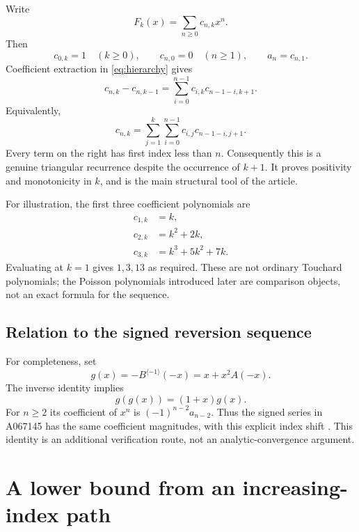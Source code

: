 \documentclass[11pt]{article}
\numberwithin{equation}{section}
\theoremstyle{remark}
\begin{document}
Write
\[
 F_k(x)=\sum_{n\ge0}c_{n,k}x^n.
\]
Then
\begin{equation}\label{eq:boundary}
 c_{0,k}=1\quad(k\ge0),\qquad c_{n,0}=0\quad(n\ge1),
 \qquad a_n=c_{n,1}.
\end{equation}
Coefficient extraction in \eqref{eq:hierarchy} gives
\begin{equation}\label{eq:triangular}
 c_{n,k}-c_{n,k-1}
 =\sum_{i=0}^{n-1}c_{i,k}c_{n-1-i,k+1}.
\end{equation}
Equivalently,
\begin{equation}\label{eq:triangularsum}
 c_{n,k}=\sum_{j=1}^k\sum_{i=0}^{n-1}
                  c_{i,j}c_{n-1-i,j+1}.
\end{equation}
Every term on the right has first index less than $n$. Consequently this
is a genuine triangular recurrence despite the occurrence of $k+1$.
It proves positivity and monotonicity in $k$, and is the main structural
tool of the article.

For illustration, the first three coefficient polynomials are
\begin{align*}
 c_{1,k}&=k,\\
 c_{2,k}&=k^2+2k,\\
 c_{3,k}&=k^3+5k^2+7k.
\end{align*}
Evaluating at $k=1$ gives $1,3,13$ as required. These are not ordinary
Touchard polynomials; the Poisson polynomials introduced later are
comparison objects, not an exact formula for the sequence.

\subsection{Relation to the signed reversion sequence}

For completeness, set
\[
 g(x)=-B^{\langle-1\rangle}(-x)=x+x^2A(-x).
\]
The inverse identity implies
\[
 g(g(x))=(1+x)g(x).
\]
For $n\ge2$ its coefficient of $x^n$ is $(-1)^{n-2}a_{n-2}$.
Thus the signed series in A067145 has the same coefficient magnitudes,
with this explicit index shift \cite{oeis-a067145}. This identity is an
additional verification route, not an analytic-convergence argument.

\section{A lower bound from an increasing-index path}
\end{document}
